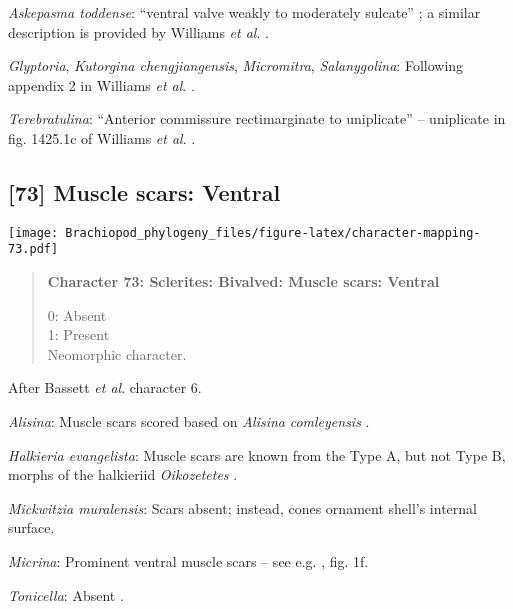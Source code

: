 \documentclass[openany]{book}
\theoremstyle{definition}
\theoremstyle{definition}
\theoremstyle{definition}
\theoremstyle{remark}
\begin{document}
\hypertarget{Askepasma_toddense-coding-72}{}
\emph{Askepasma toddense}: ``ventral valve weakly to moderately
sulcate'' \citep{Topper2013Theoldest}; a similar description is provided
by Williams \emph{et al}.
\citeyearpar{Williams2000LinguliformeaCraniiformea}.

\hypertarget{Glyptoria-coding-72}{}
\emph{Glyptoria}, \emph{Kutorgina chengjiangensis}, \emph{Micromitra},
\emph{Salanygolina}: Following appendix 2 in Williams \emph{et al}.
\citeyearpar{Williams1998Thediversity}.

\hypertarget{Terebratulina-coding-72}{}
\emph{Terebratulina}: ``Anterior commissure rectimarginate to
uniplicate'' -- uniplicate in fig. 1425.1c of Williams \emph{et al}.
\citeyearpar{Williams2006Rhynchonelliformeapart}.

\subsection*{{[}73{]} Muscle scars: Ventral}\label{muscle-scars-ventral}

\texttt{[image: Brachiopod\_phylogeny\_files/figure-latex/character-mapping-73.pdf]}

\begin{quote}
\textbf{Character 73: Sclerites: Bivalved: Muscle scars: Ventral }

0: Absent\\
1: Present\\
Neomorphic character.
\end{quote}

After Bassett \emph{et al}.
\citeyearpar{Bassett2001Functionalmorphology} character 6.

\hypertarget{Alisina-coding-73}{}
\emph{Alisina}: Muscle scars scored based on \emph{Alisina}
\emph{comleyensis} \citep{Bassett2001Functionalmorphology}.

\hypertarget{Halkieria_evangelista-coding-73}{}
\emph{Halkieria evangelista}: Muscle scars are known from the Type A,
but not Type B, morphs of the halkieriid \emph{Oikozetetes}
\citep{Paterson2009, Jacquet2014}.

\hypertarget{Mickwitzia_muralensis-coding-73}{}
\emph{Mickwitzia muralensis}: Scars absent; instead, cones ornament
shell's internal surface.

\hypertarget{Micrina-coding-73}{}
\emph{Micrina}: Prominent ventral muscle scars -- see e.g.
\citet{Holmer2008TheEarly}, fig. 1f.

\hypertarget{Tonicella-coding-73}{}
\emph{Tonicella}: Absent \citep{Schwabe2010}.
\end{document}

